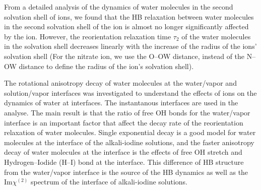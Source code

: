 
From a detailed analysis of the dynamics of water molecules in the second solvation shell of ions, 
we found that the HB relaxation between water molecules in the second solvation shell of the ion is almost
no longer significantly affected by the ion.
However, the reorientation relaxation time $\tau_2$ of the water molecules in the solvation shell decreases linearly with the increase of the radius of the ions' solvation shell 
(For the nitrate ion, we use the O--OW distance, instead of the N--OW distance to define the radius of the ion's solvation shell).

The rotational anisotropy decay of water molecules at the water/vapor and solution/vapor interfaces was investigated to
understand the effects of ions on the dynamics of water at interfaces.
The instantanous interfaces are used in the analyse. The main result is that the ratio of free OH bonds for the water/vapor interface is an important factor 
that affect the decay rate of the reorientation relaxation of water molecules.
Single exponential decay is a good model for water molecules at the interface of the alkali-iodine solutions,
and the faster anisotropy decay of water molecules at the interface is the effects of free OH stretch and Hydrogen--Iodide (H--I) bond at the interface.
This difference of HB structure from the water/vapor interface is the source of 
the HB dynamics as well as the Im$\chi^{(2)}$ spectrum of the interface of alkali-iodine solutions.  
